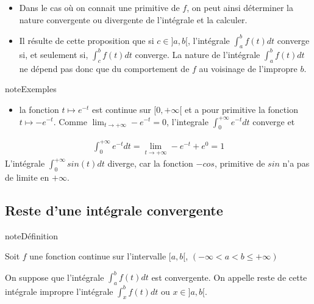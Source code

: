 \documentclass[letterpaper,10pt,french]{sphinxmanual}
\begin{document}
\sphinxAtStartPar
{}
\begin{itemize}
\item {} 
\sphinxAtStartPar
Dans le cas où on connait une primitive de \(f\), on peut ainsi déterminer la nature convergente ou divergente de l’intégrale et la calculer.

\item {} 
\sphinxAtStartPar
Il résulte de cette proposition que si \(c\in ]a, b[\), l’intégrale \(\int_a^b f(t)dt\) converge si, et seulement si, \(\int_c^b f(t)dt\) converge. La nature de l’intégrale \(\int_a^b f(t)dt\) ne dépend pas donc que du comportement de \(f\) au voisinage de l’impropre \(b\).

\end{itemize}

\begin{sphinxadmonition}{note}{Exemples}
\begin{itemize}
\item {} 
\sphinxAtStartPar
la fonction \( t \mapsto e^{-t}\) est continue sur \([0, +\infty[\) et a pour primitive la fonction \(t\mapsto -e^{-t}\). Comme \(\lim_{t \to +\infty} -e^{-t} = 0\), l’integrale \(\int_0^{+\infty} e^{-t}dt\) converge et

\end{itemize}
\begin{equation*}
\begin{split}
\int_0^{+\infty}e^{-t}dt = \lim_{t\to +\infty} -e^{-t} + e^{0} = 1
\end{split}
\end{equation*}
\sphinxhyphen{} L’intégrale \(\int_0^{+\infty} sin(t)dt\) diverge, car la fonction \(-cos\), primitive de \(sin\) n’a pas de limite en \(+\infty\).
\end{sphinxadmonition}


\subsection{Reste d’une intégrale convergente}
\label{\detokenize{def:reste-d-une-integrale-convergente}}
\begin{sphinxadmonition}{note}{Définition}

\sphinxAtStartPar
Soit \(f\) une fonction continue sur l’intervalle \([a, b[\), \((-\infty <a < b \leq +\infty)\)

\sphinxAtStartPar
On suppose que l’intégrale \(\int_a^b f(t)dt\)  est convergente. On appelle reste de cette intégrale impropre l’intégrale \(\int_x^b f(t)dt\) ou \(x\in]a, b[\).
\end{sphinxadmonition}
\end{document}
